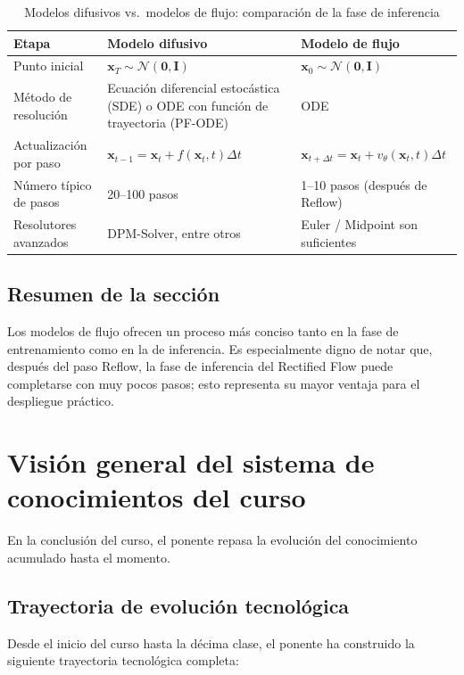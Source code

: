 \documentclass[a4paper]{article}
\begin{document}
\begin{table}[H]
\centering
\caption{Modelos difusivos vs.\ modelos de flujo: comparación de la fase de inferencia}
\begin{tabular}{@{} p{3.8cm} p{5cm} p{5cm} @{}}
\toprule
\textbf{Etapa} & \textbf{Modelo difusivo} & \textbf{Modelo de flujo} \\
\midrule
Punto inicial & $\mathbf{x}_T \sim \mathcal{N}(\mathbf{0},\mathbf{I})$ & $\mathbf{x}_0 \sim \mathcal{N}(\mathbf{0},\mathbf{I})$ \\
Método de resolución & Ecuación diferencial estocástica (SDE) o ODE con función de trayectoria (PF-ODE) & ODE \\
Actualización por paso & $\mathbf{x}_{t-1} = \mathbf{x}_t + f(\mathbf{x}_t,t)\Delta t$ & $\mathbf{x}_{t+\Delta t} = \mathbf{x}_t + v_\theta(\mathbf{x}_t,t)\Delta t$ \\
Número típico de pasos & 20--100 pasos & 1--10 pasos (después de Reflow) \\
Resolutores avanzados & DPM-Solver, entre otros & Euler / Midpoint son suficientes \\
\bottomrule
\end{tabular}
\end{table}

\subsection{Resumen de la sección}

Los modelos de flujo ofrecen un proceso más conciso tanto en la fase de entrenamiento como en la de inferencia. Es especialmente digno de notar que, después del paso Reflow, la fase de inferencia del Rectified Flow puede completarse con muy pocos pasos; esto representa su mayor ventaja para el despliegue práctico.
\section{Visión general del sistema de conocimientos del curso}

En la conclusión del curso, el ponente repasa la evolución del conocimiento acumulado hasta el momento.

\subsection{Trayectoria de evolución tecnológica}

Desde el inicio del curso hasta la décima clase, el ponente ha construido la siguiente trayectoria tecnológica completa:
\end{document}
